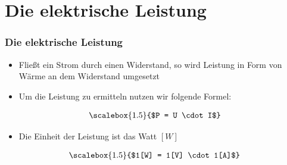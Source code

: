 
\section{Die elektrische Leistung}
\begin{frame}
  \frametitle{Die elektrische Leistung}
  \begin{itemize}
    \item Fließt ein Strom durch einen Widerstand, so wird Leistung in Form von Wärme an dem Widerstand umgesetzt
    \item Um die Leistung zu ermitteln nutzen wir folgende Formel:
  \end{itemize}
  \begin{align}
    	\scalebox{1.5}{$P = U \cdot I$}
  \end{align}
  \begin{itemize}
    \item Die Einheit der Leistung ist das Watt $[W]$
  \end{itemize}
  \begin{align}
    	\scalebox{1.5}{$1[W] = 1[V] \cdot 1[A]$}
  \end{align}
\end{frame}


